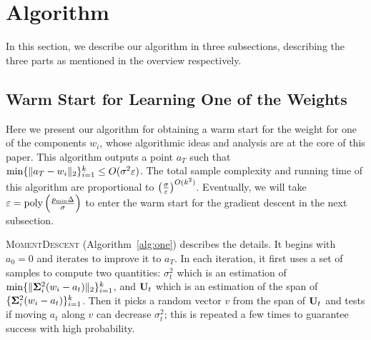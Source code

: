 \section{Algorithm} \label{sec:algo}

In this section, we describe our algorithm in three subsections, describing the three parts as mentioned in the overview respectively.



\subsection{Warm Start for Learning One of the Weights} \label{sec:warm_start}

Here we present our algorithm for obtaining a warm start for the weight for one of the components $w_i$, whose
algorithmic ideas and analysis are at the core of this paper.
This algorithm outputs a point $a_T$ such that $\min\{\|a_T - w_i\|_2\}_{i = 1}^k \leq O(\sigma^2\varepsilon)$. The total sample complexity and running time of this algorithm are proportional to $\left(\frac{\sigma}{\varepsilon} \right)^{O(k^2)}$. Eventually, we will take $\varepsilon = \text{poly}\left(\frac{p_{\min}\Delta}{\sigma}\right)$ to enter the warm start for the gradient descent in the next subsection. 

\textsc{MomentDescent} (Algorithm~\ref{alg:one}) describes the details.
It begins with $a_0 = 0$ and iterates to improve it to $a_T$. 
In each iteration, it first uses a set of samples to compute two quantities: $\sigma_t^2$ which is an estimation of $\min \{\|\bold{\Sigma}_i^2 (w_i - a_t)\|_2\}_{i=1}^k$, and $\bold{U}_t$ which is an estimation of the span of $\{\bold{\Sigma}_i^2 (w_i - a_t)\}_{i=1}^k$. Then it picks a random vector $v$ from the span of $\bold{U}_t$ and tests if moving $a_t$ along $v$ can decrease $\sigma_t^2$; this is repeated a few times to guarantee success with high probability. 


